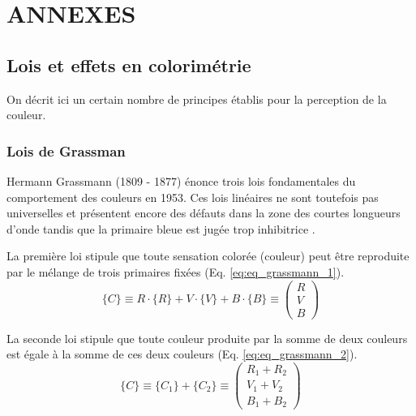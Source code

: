\part*{ANNEXES}
\newpage	
	
	\chapter*{Lois et effets en colorimétrie}
	
	\par On décrit ici un certain nombre de principes établis pour la perception de la couleur.
				
		\section*{Lois de Grassman}
		\par Hermann Grassmann (1809 - 1877) énonce trois lois fondamentales du comportement des couleurs en 1953. Ces lois linéaires ne sont toutefois pas universelles et présentent encore des défauts dans la zone des courtes longueurs d'onde tandis que la primaire bleue est jugée trop inhibitrice \citep{le_grand_optique_1972}.
		
		\par La première loi stipule que toute sensation colorée (couleur) peut être reproduite par le mélange de trois primaires fixées (Eq. \ref{eq:eq_grassmann_1}).		
		\begin{equation}
			\{C\} \equiv R \cdot \{R\} + V \cdot \{V\} + B \cdot \{B\} \equiv \left( \begin{array}{ccc} R \\ V \\ B \end{array} \right)
			\label{eq:eq_grassmann_1}
		\end{equation}
		
		\par La seconde loi stipule que toute couleur produite par la somme de deux couleurs est égale à la somme de ces deux couleurs (Eq. \ref{eq:eq_grassmann_2}).
		\begin{equation}
			\{C\} \equiv \{C_1\} + \{C_2\} \equiv \left( \begin{array}{ccc} R_1 + R_2 \\ V_1 + V_2 \\ B_1 + B_2 \end{array} \right)
			\label{eq:eq_grassmann_2}
		\end{equation}
		
